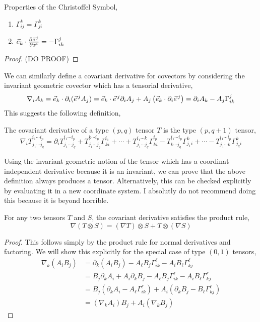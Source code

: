 \documentclass[11pt, a4paper]{article}
\begin{document}
\begin{lemma}
Properties of the Christoffel Symbol,
\begin{enumerate}
\item $\Gamma^k_{ij} = \Gamma^k_{ji}$

\item $\vec{e}_k \cdot \frac{\partial{\vec{e}^{\, j}}}{\partial{x^i}} = - \Gamma^{j}_{ik}$

\end{enumerate}
\end{lemma} 

\begin{proof}
(DO PROOF)
\end{proof}

We can similarly define a covariant derivative for covectors by considering the invariant geometric covector which has a tensorial derivative,
\[ \nabla_i A_k =  \vec{e}_k \cdot \partial_i (\vec{e}^{\, j} A_j) = \vec{e}_{k} \cdot \vec{e}^{\, j} \partial_i A_j + A_j \left( \vec{e}_{k} \cdot \partial_i \vec{e}^{\, j} \right) = \partial_i A_k - A_j \Gamma^j_{ik} \]
This suggests the following definition,
\begin{definition}
The covariant derivative of a type $(p,q)$ tensor $T$ is the type $(p, q+1)$ tensor,
\[ \nabla_{i} T^{i_1 \cdots i_p}_{j_1 \cdots j_q} = \partial_i T^{i_1 \cdots i_p}_{j_1 \cdots  j_q} + T^{k \cdots i_p}_{j_1 \cdots j_q} \Gamma^{i_1}_{k i} + \cdots + T^{i_1 \cdots k}_{j_1 \cdots j_q} \Gamma^{i_p}_{k i} - T^{i_1 \cdots i_p}_{k \cdots  j_q} \Gamma^{k}_{j_1 i} + \cdots - T^{i_1 \cdots i_p}_{j_1 \cdots k} \Gamma^{k}_{j_q i} \]
\end{definition}
Using the invariant geometric notion of the tensor which has a coordinat independent derivative because it is an invariant, we can prove that the above definition always produces a tensor. Alternatively, this can be checked explicitly by evaluating it in  a new coordinate system. I absolutly do not recommend doing this because it is beyond horrible. 

\begin{lemma}
For any two tensors $T$ and $S$, the covariant derivative satisfies the product rule,
\[\nabla (T \otimes S) = (\nabla  T) \otimes S + T \otimes (\nabla S)\]
\end{lemma}

\begin{proof}
This follows simply by the product rule for normal derivatives and factoring. We will show this explicitly for the special case of type $(0, 1)$ tensors,
\begin{align*}
\nabla_k (A_i B_j) & = \partial_k (A_i B_j) - A_\ell B_j \Gamma^\ell_{i k} - A_i B_{\ell} \Gamma^\ell_{k j}
\\
& = B_j \partial_k A_i + A_i \partial_k B_j - A_\ell B_j \Gamma^\ell_{i k} - A_i B_{\ell} \Gamma^\ell_{k j}  
\\
& = B_j \left( \partial_k A_i - A_\ell \Gamma^\ell_{i k} \right) + A_i \left( \partial_k B_j - B_{\ell} \Gamma^\ell_{k j}  \right)
\\
& = (\nabla_k A_i) B_j + A_i (\nabla_k B_j)
\end{align*}
\end{proof}
\end{document}
